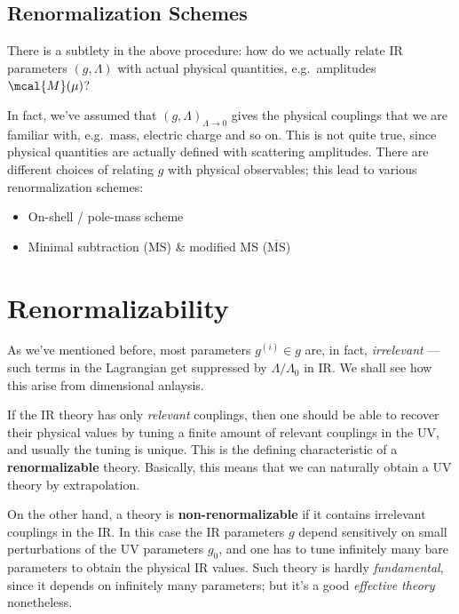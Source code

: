 \documentclass[a4paper
	,10pt
]{article}
\begin{document}
\subsection{Renormalization Schemes}
	
	There is a subtlety in the above procedure: how do we actually relate IR
	parameters $(g,\Lambda)$ with actual physical quantities,
	e.g.~amplitudes $\mcal{M}(\mu)$?
	
	In fact, we've assumed that $(g,\Lambda)_{\Lambda\to 0}$ gives the
	physical couplings that we are familiar with, e.g.~mass, electric charge
	and so on. This is not quite true, since physical quantities are
	actually defined with scattering amplitudes. There are different choices
	of relating $g$ with physical observables; this lead to various
	renormalization schemes:
	
	\begin{itemize}[nosep]
	
	\item
	  On-shell / pole-mass scheme
	\item
	  Minimal subtraction ($\mathrm{MS}$) \& modified MS
	  ($\overline{\mathrm{MS}}$)
	\end{itemize}
	
\section{Renormalizability}
	As we've mentioned before, most parameters $g^{(i)} \in g$ are, in fact, \emph{irrelevant} --- such terms in the Lagrangian get suppressed by $\Lambda/\Lambda_0$ in IR. We shall see how this arise from dimensional anlaysis.
	
	
	
	If the IR theory has only \emph{relevant} couplings, then one should be
	able to recover their physical values by tuning a finite amount of
	relevant couplings in the UV, and usually the tuning is unique. This is
	the defining characteristic of a \textbf{renormalizable} theory.
	Basically, this means that we can naturally obtain a UV theory by
	extrapolation.
	
	On the other hand, a theory is \textbf{non-renormalizable} if it
	contains irrelevant couplings in the IR. In this case the IR parameters
	$g$ depend sensitively on small perturbations of the UV parameters
	$g_0$, and one has to tune infinitely many bare parameters to obtain
	the physical IR values. Such theory is hardly \emph{fundamental}, since
	it depends on infinitely many parameters; but it's a good
	\emph{effective theory} nonetheless.
	
\end{document}
